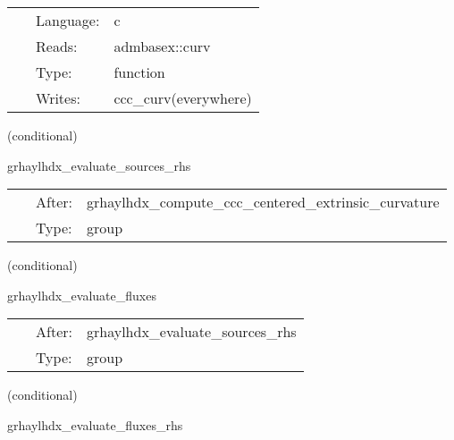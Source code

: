 \documentclass{article}
\begin{document}
 \begin{tabular*}{160mm}{cll} 
~ & Language:  & c \\ 
~ & Reads:  & admbasex::curv \\ 
~ & Type:  & function \\ 
~ & Writes:  & ccc\_curv(everywhere) \\ 
\end{tabular*} 


\vspace{5mm}

   (conditional) 

\hspace{5mm} grhaylhdx\_evaluate\_sources\_rhs 

\hspace{5mm}{\it evaluate source terms in grhd rhss } 


\hspace{5mm}

 \begin{tabular*}{160mm}{cll} 
~ & After:  & grhaylhdx\_compute\_ccc\_centered\_extrinsic\_curvature \\ 
~ & Type:  & group \\ 
\end{tabular*} 


\vspace{5mm}

   (conditional) 

\hspace{5mm} grhaylhdx\_evaluate\_fluxes 

\hspace{5mm}{\it evaluate fluxes for grhd rhss } 


\hspace{5mm}

 \begin{tabular*}{160mm}{cll} 
~ & After:  & grhaylhdx\_evaluate\_sources\_rhs \\ 
~ & Type:  & group \\ 
\end{tabular*} 


\vspace{5mm}

   (conditional) 

\hspace{5mm} grhaylhdx\_evaluate\_fluxes\_rhs 

\hspace{5mm}{\it evaluate flux terms in grhd rhss } 
\end{document}
